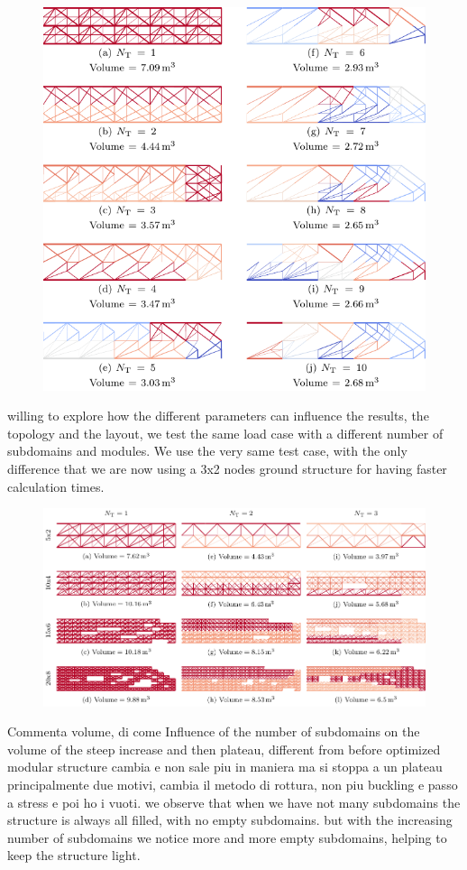 \begin{figure}
    \centering
    \includegraphics{figures/06_DMO/00_tug_bench_buck/buck.pdf}
    \caption{}
    \label{fig:06_tug_bench_buck}
\end{figure}

willing to explore how the different parameters can influence the results, the topology and the layout, we test the same load case with a different number of subdomains and modules. We use the very same test case, with the only difference that we are now using a 3x2 nodes ground structure for having faster calculation times. 

\begin{figure}
    \centering
    \includegraphics{figures/06_DMO/00_tug_bench_size/size.pdf}
    \caption{}
    \label{fig:06}
\end{figure}
Commenta volume, di come Influence of the number 
of subdomains on the volume of the steep increase and then plateau, different from before
optimized modular structure cambia e non sale piu in maniera ma si stoppa a un plateau
principalmente due motivi, cambia il metodo di rottura, non piu buckling e passo a stress e poi ho i vuoti. we observe that when we have not many subdomains the structure is always all filled, with  no empty subdomains. but with the increasing number of subdomains we notice more and more empty subdomains, helping to keep the structure light.

